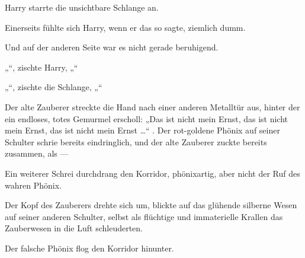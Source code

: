 Harry starrte die unsichtbare Schlange an.

Einerseits fühlte sich Harry, wenn er das so sagte, ziemlich dumm.

Und auf der anderen Seite war es nicht gerade beruhigend.

„“, zischte Harry, „“

„“, zischte die Schlange, „“

\later

Der alte Zauberer streckte die Hand nach einer anderen Metalltür aus, hinter der ein endloses, totes Gemurmel erscholl:
„Das ist nicht mein Ernst, das ist nicht mein Ernst, das ist nicht mein Ernst …“ . Der rot-goldene Phönix auf seiner Schulter schrie bereits eindringlich, und der alte Zauberer zuckte bereits zusammen, als —

Ein weiterer Schrei durchdrang den Korridor, phönixartig, aber nicht der Ruf des wahren Phönix.

Der Kopf des Zauberers drehte sich um, blickte auf das glühende silberne Wesen auf seiner anderen Schulter, selbst als flüchtige und immaterielle Krallen das Zauberwesen in die Luft schleuderten.

Der falsche Phönix flog den Korridor hinunter.

